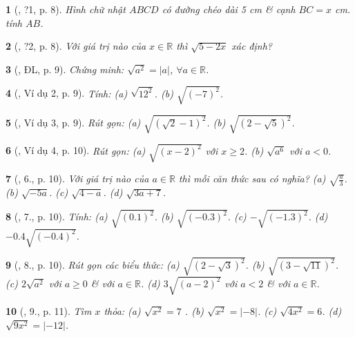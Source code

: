 \documentclass{article}
\newtheorem{baitoan}{}%
\begin{document}
\begin{baitoan}[\cite{SGK_Toan_9_tap_1}, ?1, p. 8]
	Hình chữ nhật $ABCD$ có đường chéo dài \emph{5 cm} \& cạnh $BC =  x$ \emph{cm}. tính $AB$.
\end{baitoan}

\begin{baitoan}[\cite{SGK_Toan_9_tap_1}, ?2, p. 8]
	Với giá trị nào của $x\in\mathbb{R}$ thì $\sqrt{5 - 2x}$ xác định?
\end{baitoan}

\begin{baitoan}[\cite{SGK_Toan_9_tap_1}, ĐL, p. 9]
	Chứng minh: $\sqrt{a^2} = |a|$, $\forall a\in\mathbb{R}$.
\end{baitoan}

\begin{baitoan}[\cite{SGK_Toan_9_tap_1}, Ví dụ 2, p. 9]
	Tính: (a) $\sqrt{12^2}$. (b) $\sqrt{(-7)^2}$.
\end{baitoan}

\begin{baitoan}[\cite{SGK_Toan_9_tap_1}, Ví dụ 3, p. 9]
	Rút gọn: (a) $\sqrt{(\sqrt{2} - 1)^2}$. (b) $\sqrt{(2 - \sqrt{5})^2}$.
\end{baitoan}

\begin{baitoan}[\cite{SGK_Toan_9_tap_1}, Ví dụ 4, p. 10]
	Rút gọn: (a) $\sqrt{(x - 2)^2}$ với $x\ge2$. (b) $\sqrt{a^6}$ với $a < 0$.
\end{baitoan}

\begin{baitoan}[\cite{SGK_Toan_9_tap_1}, 6., p. 10]
	Với giá trị nào của $a\in\mathbb{R}$ thì mỗi căn thức sau có nghĩa? (a) $\sqrt{\frac{a}{3}}$. (b) $\sqrt{-5a}$. (c) $\sqrt{4 - a}$. (d) $\sqrt{3a + 7}$.
\end{baitoan}

\begin{baitoan}[\cite{SGK_Toan_9_tap_1}, 7., p. 10]
	Tính: (a) $\sqrt{(0.1)^2}$. (b) $\sqrt{(-0.3)^2}$. (c) $-\sqrt{(-1.3)^2}$. (d) $-0.4\sqrt{(-0.4)^2}$.
\end{baitoan}

\begin{baitoan}[\cite{SGK_Toan_9_tap_1}, 8., p. 10]
	Rút gọn các biểu thức: (a) $\sqrt{(2 - \sqrt{3})^2}$. (b) $\sqrt{(3 - \sqrt{11})^2}$. (c) $2\sqrt{a^2}$ với $a\ge0$ \& với $a\in\mathbb{R}$. (d) $3\sqrt{(a - 2)^2}$ với $a < 2$ \& với $a\in\mathbb{R}$.
\end{baitoan}

\begin{baitoan}[\cite{SGK_Toan_9_tap_1}, 9., p. 11]
	Tìm $x$ thỏa: (a) $\sqrt{x^2} = 7$ . (b) $\sqrt{x^2} = |-8|$. (c) $\sqrt{4x^2} = 6$. (d) $\sqrt{9x^2} = |-12|$.
\end{baitoan}
\end{document}
